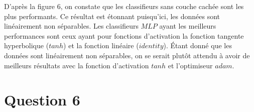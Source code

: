 \documentclass[a4paper,french,10pt]{article}
\begin{document}
	\begin{figure}[htp] 
		\centering
		\hfill%
		\caption{}
	\end{figure}
	
	D'après la figure $6$, on constate que les classifieurs sans couche cachée sont les plus performants. Ce résultat est étonnant puisqu'ici, les données sont linéairement non séparables. Les classifieurs $MLP$ ayant les meilleurs performances sont ceux ayant pour fonctions d'activation la fonction tangente hyperbolique ($tanh$) et la fonction linéaire ($identity$). Étant donné que les données sont linéairement non séparables, on se serait plutôt attendu à avoir de meilleurs résultats avec la fonction d'activation $tanh$ et l'optimiseur $adam$.
	
	
	\section{Question 6}
	
\end{document}
